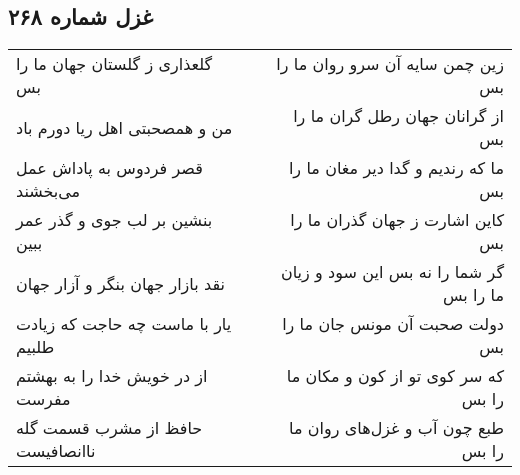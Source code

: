 \begin{center}
\section*{غزل شماره ۲۶۸}
\label{sec:sh268}
\begin{longtable}{l p{0.5cm} r}
گلعذاری ز گلستان جهان ما را بس
&&
زین چمن سایه آن سرو روان ما را بس
\\
من و همصحبتی اهل ریا دورم باد
&&
از گرانان جهان رطل گران ما را بس
\\
قصر فردوس به پاداش عمل می‌بخشند
&&
ما که رندیم و گدا دیر مغان ما را بس
\\
بنشین بر لب جوی و گذر عمر ببین
&&
کاین اشارت ز جهان گذران ما را بس
\\
نقد بازار جهان بنگر و آزار جهان
&&
گر شما را نه بس این سود و زیان ما را بس
\\
یار با ماست چه حاجت که زیادت طلبیم
&&
دولت صحبت آن مونس جان ما را بس
\\
از در خویش خدا را به بهشتم مفرست
&&
که سر کوی تو از کون و مکان ما را بس
\\
حافظ از مشرب قسمت گله ناانصافیست
&&
طبع چون آب و غزل‌های روان ما را بس
\\
\end{longtable}
\end{center}
